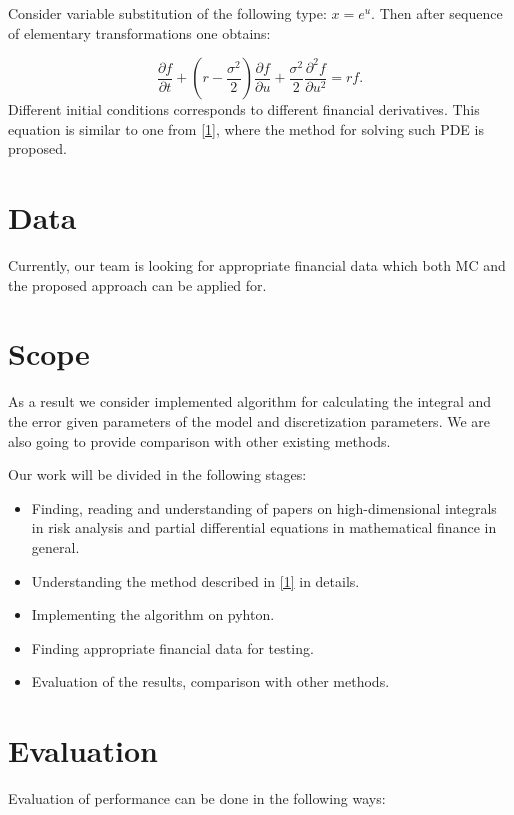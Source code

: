 \documentclass[11pt,a4paper]{extarticle}
\begin{document}
Consider variable substitution of the following type: $x=e^u$. Then after sequence of elementary transformations one obtains:

\[
	\frac{\partial f}{\partial t} + \left(r-\frac{\sigma^2}{2}\right) \frac{\partial f}{\partial u} + \frac{\sigma^2}{2} \frac{\partial^2 f}{\partial u^2} = rf.
\]
Different initial conditions corresponds to different financial derivatives. This equation is similar to one from \href{http://arxiv.org/abs/1504.06149}{[1]}, where the method for solving such PDE is proposed.

\section{Data}
	
Currently, our team is looking for appropriate financial data which both MC and the proposed approach can be applied for.
					 							
\section{Scope}

As a result we consider implemented algorithm for calculating the integral and the error given parameters of the model and discretization parameters.	We are also going to provide comparison with other existing methods. 

Our work will be divided in the following stages:
\begin{itemize}
    \item Finding, reading and understanding of papers on high-dimensional integrals in risk analysis and partial differential equations in mathematical finance in general.
    \item Understanding the method described in \href{http://arxiv.org/abs/1504.06149}{[1]} in details.
    \item Implementing the algorithm on pyhton.
    \item Finding appropriate financial data for testing.
    \item Evaluation of the results, comparison with other methods.
\end{itemize}

\section{Evaluation}

Evaluation of performance can be done in the following ways:
\end{document}
